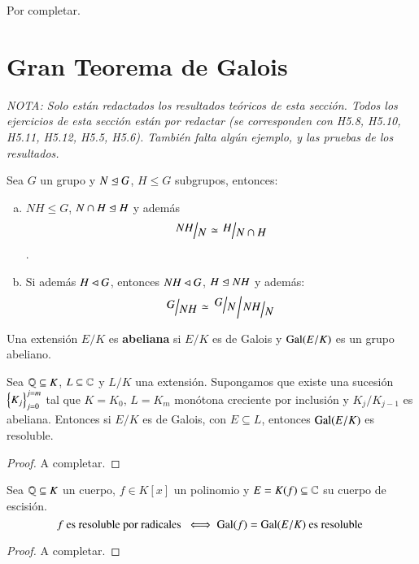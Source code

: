 \begin{ex}[H5.4]
    Por completar. %
\end{ex}

\section{Gran Teorema de Galois}

\textit{NOTA: Solo están redactados los resultados teóricos de esta sección. Todos los ejercicios de esta sección están por redactar (se corresponden con H5.8, H5.10, H5.11, H5.12, H5.5, H5.6). También falta algún ejemplo, y las pruebas de los resultados.}

\begin{obs}
    Sea $G$ un grupo y $N \trianglelefteq G$, $H \leq G$ subgrupos, entonces:
    \begin{enumerate}[a)]
        \item $NH \leq G$, $N \cap H \trianglelefteq H$ y además $$\quo{NH}{N} \isom \quo{H}{N\cap H}$$.
        \item Si además $H \lhd G$, entonces $NH \lhd G$, $H  \trianglelefteq NH$ y además:
        $$
            \quo{G}{NH} \isom \quo{\quo{G}{N}}{\quo{NH}{N}}
        $$
    \end{enumerate}
\end{obs}

\begin{dfn}
    Una extensión $E/K$ es \textbf{abeliana} si $E/K$ es de Galois y $\mathrm{Gal}(E/K)$ es un grupo abeliano.
\end{dfn}

\begin{lm}\label{lm:5.2}
    Sea $\mathbb{Q} \subseteq K$, $L \subseteq \mathbb{C}$ y $L/K$ una extensión. Supongamos que existe una sucesión $\left\{K_j\right\}_{j=0}^{j=m}$ tal que $K = K_0$, $L = K_m$ monótona creciente por inclusión y $K_j/K_{j-1}$ es abeliana. Entonces si $E/K$ es de Galois, con $E \subseteq L$, entonces $\mathrm{Gal}(E/K)$ es resoluble.
\end{lm}
\begin{proof}
    A completar.
\end{proof}
\begin{thm}\label{thm:5.3}\label{thm:GTG}
    Sea $\mathbb{Q} \subseteq K$ un cuerpo, $f \in K[x]$ un polinomio y $E = K(f) \subseteq \mathbb{C}$ su cuerpo de escisión.
    $$
        f \text{ es resoluble por radicales } \iff \mathrm{Gal}(f) = \mathrm{Gal}(E/K) \text{ es resoluble }
    $$
\end{thm}
\begin{proof}
    A completar.
\end{proof}

